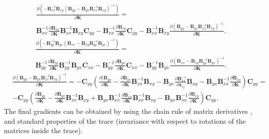 \begin{align}
& \frac{\partial (-\mathbf{B}_{xx}^{-1}\mathbf{B}_{xy}(\mathbf{B}_{yy}-\mathbf{B}_{yx}\mathbf{B}_{xx}^{-1}\mathbf{B}_{xy})^{-1})}{\partial \mathbf{K}} = \nonumber \\
& \mathbf{B}_{xx}^{-1}\frac{\partial \mathbf{B}_{xx}}{\partial \mathbf{K}}\mathbf{B}_{xx}^{-1}\mathbf{B}_{xy}\mathbf{C}_{yy} - \mathbf{B}_{xx}^{-1}\frac{\partial \mathbf{B}_{xy}}{\partial \mathbf{K}}\mathbf{C}_{yy} - \mathbf{B}_{xx}^{-1}\mathbf{B}_{xy}\frac{\partial (\mathbf{B}_{yy}-\mathbf{B}_{yx}\mathbf{B}_{xx}^{-1}\mathbf{B}_{xy})^{-1}}{\partial \mathbf{K}}.
\end{align}
\begin{align}
& \frac{\partial (-\mathbf{B}_{yy}^{-1}\mathbf{B}_{yx}(\mathbf{B}_{xx}-\mathbf{B}_{xy}\mathbf{B}_{yy}^{-1}\mathbf{B}_{yx})^{-1})}{\partial \mathbf{K}} = \nonumber \\
& \mathbf{B}_{yy}^{-1}\frac{\partial \mathbf{B}_{yy}}{\partial \mathbf{K}}\mathbf{B}_{yy}^{-1}\mathbf{B}_{yx}\mathbf{C}_{xx} - \mathbf{B}_{yy}^{-1}\frac{\partial \mathbf{B}_{yx}}{\partial \mathbf{K}}\mathbf{C}_{xx} - \mathbf{B}_{yy}^{-1}\mathbf{B}_{yx}\frac{\partial (\mathbf{B}_{xx}-\mathbf{B}_{xy}\mathbf{B}_{yy}^{-1}\mathbf{B}_{yx})^{-1}}{\partial \mathbf{K}}.
\end{align}
\begin{align}
& \frac{\partial (\mathbf{B}_{yy}-\mathbf{B}_{yx}\mathbf{B}_{xx}^{-1}\mathbf{B}_{xy})^{-1}}{\partial \mathbf{K}} = -\mathbf{C}_{yy}(\frac{\partial (\mathbf{B}_{yy}}{\partial \mathbf{K}} - \frac{\partial \mathbf{B}_{yx}}{\partial \mathbf{K}}\mathbf{B}_{xx}^{-1}\mathbf{B}_{xy} - \mathbf{B}_{yx}\frac{\partial \mathbf{B}_{xx}^{-1}}{\partial \mathbf{x}_{ij}}\mathbf{B}_{xy} - \mathbf{B}_{yx}\mathbf{B}_{xx}^{-1}\frac{\partial \mathbf{B}_{xy}}{\partial \mathbf{K}})\mathbf{C}_{yy} = \nonumber \\
& -\mathbf{C}_{yy}(\frac{\partial \mathbf{B}_{yy}}{\partial \mathbf{K}} - \frac{\partial \mathbf{B}_{yx}}{\partial \mathbf{K}}\mathbf{B}_{xx}^{-1}\mathbf{B}_{xy} + \mathbf{B}_{yx}\mathbf{B}_{xx}^{-1} \frac{\partial \mathbf{B}_{xx}}{\partial \mathbf{K}} \mathbf{B}_{xx}^{-1}\mathbf{B}_{xy} - \mathbf{B}_{yx}\mathbf{B}_{xx}^{-1}\frac{\partial \mathbf{B}_{xy}}{\partial \mathbf{K}})\mathbf{C}_{yy} .
\end{align}
The final gradients can be obtained by using the chain rule of matrix derivatives \cite{petersen2012}, and standard properties of the trace (invariance with respect to rotations of the matrices inside the trace).

